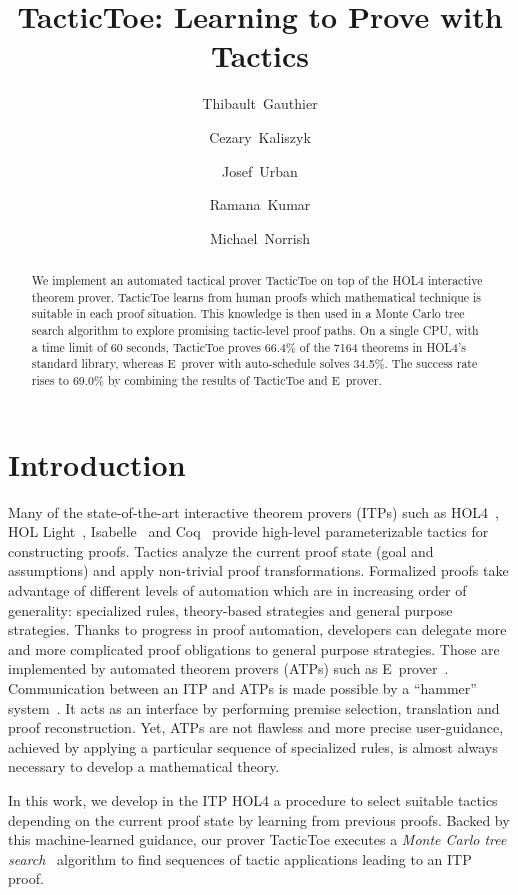 \documentclass[runningheads,a4paper,draft]{svjour3}
\title{TacticToe: Learning to Prove with Tactics}
\author{\mbox{Thibault Gauthier} \and \mbox{Cezary Kaliszyk} \and \mbox{Josef
Urban} \and \mbox{Ramana Kumar} \and \mbox{Michael Norrish}}
\institute{Thibault Gauthier and Cezary Kaliszyk \at
Department of Computer Science, University of Innsbruck,
Innsbruck, Austria\\ \url{{thibault.gauthier,cezary.kaliszyk}@uibk.ac.at}
\and
Josef Urban \at Czech Technical University, Prague\\\url{josef.urban@gmail.com}
\and Ramana Kumar and Michael Norrish \at Data61}
\def\holfour{\textsf{HOL4}\xspace}
\def\isabelle{\textsf{Isabelle}\xspace}
\def\hollight{\textsf{HOL Light}\xspace}
\def\coq{\textsf{Coq}\xspace}
\def\eprover{\textsf{E~prover}\xspace}
\def\tactictoe{\textsf{TacticToe}\xspace}
\begin{document}
\maketitle

\begin{abstract}
We implement an automated tactical prover TacticToe on top of the HOL4 
interactive theorem
prover. TacticToe learns from human proofs which mathematical technique is
suitable in each proof situation.
This knowledge is then used in a Monte Carlo tree search algorithm to
explore promising tactic-level proof paths.
On a single CPU, with a time limit of 60 seconds, TacticToe proves 66.4\% of
the 7164 theorems in HOL4's standard library, whereas
E~prover with auto-schedule solves 34.5\%. The success rate rises to 69.0\% by
combining the results of TacticToe and E~prover.
\end{abstract}

\section{Introduction}
Many of the state-of-the-art interactive theorem provers (ITPs) such as
  \holfour~\cite{hol4}, \hollight~\cite{Harrison09hollight},
  \isabelle~\cite{isabelle}
  and \coq~\cite{coq-book} provide high-level parameterizable tactics for constructing proofs.
  Tactics analyze the current proof state (goal and
  assumptions) and apply non-trivial proof transformations.
  Formalized proofs take advantage of different levels of automation which are
  in increasing order of generality:
  specialized rules, theory-based strategies and general purpose strategies.
  Thanks to progress in proof
  automation, developers can delegate more and more complicated proof
  obligations to general purpose strategies. Those are implemented by automated
  theorem provers (ATPs) such as \eprover~\cite{eprover}. Communication
  between
  an ITP and ATPs is made possible by a ``hammer''
  system~\cite{hammers4qed,tgck-cpp15}. It acts as an interface by performing
  premise selection, translation and proof reconstruction.
  Yet, ATPs are not flawless and more precise user-guidance, achieved
  by applying a particular sequence of specialized rules, is almost always
  necessary to develop a mathematical theory.

  In this work, we develop in the ITP \holfour a procedure to select suitable
  tactics depending on the current proof state by learning
  from previous proofs. Backed by this machine-learned guidance, our prover
  \tactictoe executes a \emph{Monte
  Carlo tree search}~\cite{montecarlo} algorithm to find sequences of tactic
  applications
  leading to an ITP proof.
\end{document}
